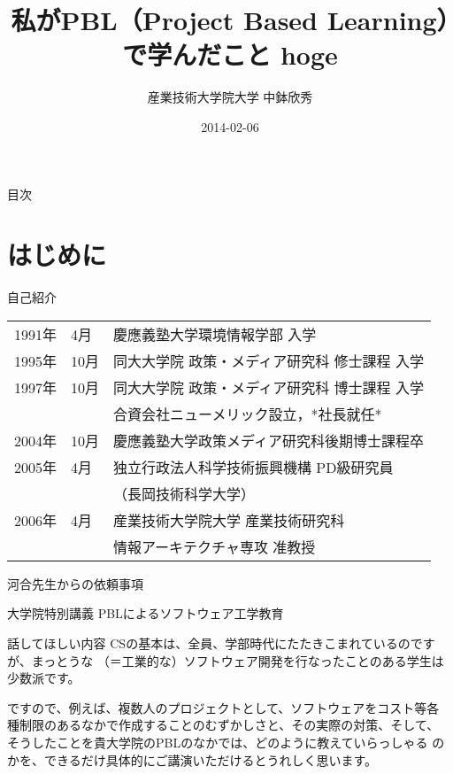 \documentclass{beamer}
\author{産業技術大学院大学 \linebreak 中鉢欣秀}
\date{2014-02-06}
\title{私がPBL（Project Based Learning）で学んだこと hoge}
\begin{document}
\maketitle

\begin{frame}{目次}
\tableofcontents
\end{frame}

\section{はじめに}
\label{sec-1}
\begin{frame}[label=sec-1-1]{自己紹介}
\begin{center}
\begin{tabular}{lll}
1991年 & 4月 & 慶應義塾大学環境情報学部 入学\\
1995年 & \alert{10月} & 同大大学院 政策・メディア研究科 修士課程 入学\\
1997年 & 10月 & 同大大学院 政策・メディア研究科 博士課程 入学\\
 &  & 合資会社ニューメリック設立，*社長就任*\\
2004年 & 10月 & 慶應義塾大学政策メディア研究科後期博士課程卒\\
2005年 & 4月 & 独立行政法人科学技術振興機構 PD級研究員\\
 &  & （長岡技術科学大学）\\
2006年 & 4月 & 産業技術大学院大学 産業技術研究科\\
 &  & 情報アーキテクチャ専攻 准教授\\
\end{tabular}
\end{center}
\end{frame}
\begin{frame}[label=sec-1-2]{河合先生からの依頼事項}
\begin{block}{大学院特別講義}
PBLによるソフトウェア工学教育
\end{block}
\begin{block}{話してほしい内容}
CSの基本は、全員、学部時代にたたきこまれているのですが、まっとうな
（＝工業的な）ソフトウェア開発を行なったことのある学生は少数派です。

ですので、例えば、複数人のプロジェクトとして、ソフトウェアをコスト等各
種制限のあるなかで作成することのむずかしさと、その実際の対策、そして、
そうしたことを貴大学院のPBLのなかでは、どのように教えていらっしゃる
のかを、できるだけ具体的にご講演いただけるとうれしく思います。
\end{block}
\end{frame}
\end{document}
